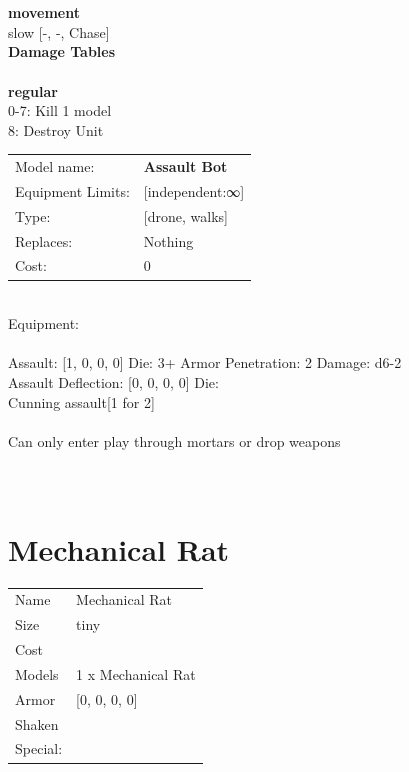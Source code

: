 \noindent \\ 


\ \\ {\bf movement } \\
slow [-, -, Chase] \\


{\bf Damage Tables} \\
\ \\ {\bf regular } \\
0-7: Kill 1 model \\
8: Destroy Unit \\


\noindent
\begin{tabular}{ll}
Model name: &{\bf Assault Bot } \\
Equipment Limits: &[independent:∞] \\
Type: &[drone, walks] \\
Replaces: &Nothing \\
Cost: & 0\\
\end{tabular}
\ \\
Equipment:  \\
\ \\
Assault: [1, 0, 0, 0] Die: 3+ Armor Penetration: 2 Damage: d6-2 \\
Assault Deflection: [0, 0, 0, 0] Die: \\
\indent Cunning assault[1 for 2]\\ 
 
\ \\
Can only enter play through mortars or drop weapons\\ 

\ \\
 
\ \\













\clearpage

\section{ Mechanical Rat }

\begin{tabular}{ll}
  Name & Mechanical Rat \\
  Size & tiny\\
  Cost & \\
  Models & 1 x Mechanical Rat\\
  Armor & [0, 0, 0, 0]\\
  Shaken & \\
  Special: \\
\end{tabular}

